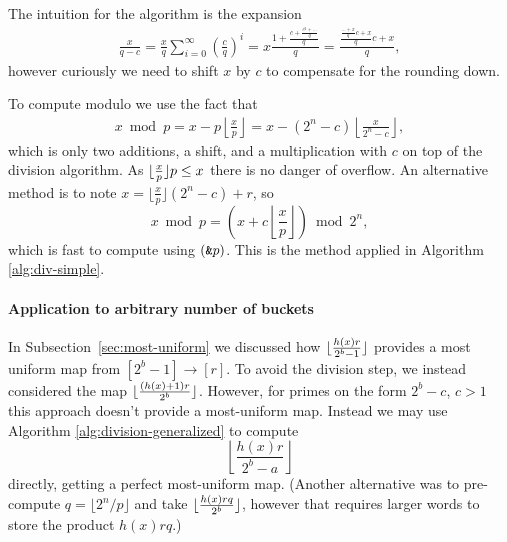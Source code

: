 The intuition for the algorithm is the expansion
\begin{align}
   \frac{x}{q-c}
   = \frac{x}{q}\sum_{i=0}^\infty \left(\frac{c}{q}\right)^i
   = x\frac{1+\frac{c+\frac{c^2 + \dots}{q}}{q}}{q}
   = \frac{\frac{\frac{\dots+x}{q}c+x}{q}c+x}{q},
\end{align}
however curiously we need to shift $x$ by $c$ to compensate for the rounding down.









To compute modulo we use the fact that
\begin{align}
   x \bmod p
   = x - p\left\lfloor\frac{x}{p}\right\rfloor
   = x - (2^n - c)\left\lfloor\frac{x}{2^n-c}\right\rfloor,
\end{align}
which is only two additions, a shift, and a multiplication with $c$ on top of the division algorithm.
As $\lfloor {\frac{x}{p}} \rfloor p \le x$ there is no danger of overflow.
An alternative method is to note
$x = \lfloor\frac{x}{p}\rfloor (2^n-c) + r$, so
$$x\bmod p = \left(x+c\left\lfloor\frac{x}{p}\right\rfloor \right) \bmod 2^n,$$
which is fast to compute using $(\mathbin{\texttt{\&}} p)$.
This is the method applied in Algorithm \ref{alg:div-simple}.


\paragraph{Application to arbitrary number of buckets}
In Subsection~\ref{sec:most-uniform} we discussed how $\lfloor {\frac{h(x)r}{2^b-1}} \rfloor$ provides a most uniform map from $[2^b-1]\to[r]$.
To avoid the division step, we instead considered the map
$\lfloor {\frac{(h(x)+1)r}{2^b}} \rfloor$.
However, for primes on the form $2^b-c$, $c>1$ this approach doesn't provide a most-uniform map.
%
Instead we may use Algorithm \ref{alg:division-generalized} to compute
$$\left\lfloor\frac{h(x)r}{2^b-a}\right\rfloor$$
directly, getting a perfect most-uniform map.
(Another alternative was to pre-compute $q = \lfloor2^n/p\rfloor$ and take
$\lfloor {\frac{h(x)rq}{2^b}} \rfloor$, however that requires larger words to store the product $h(x)rq$.)


